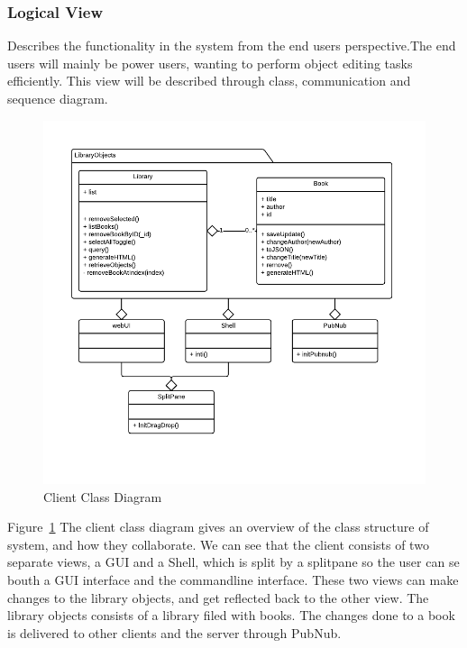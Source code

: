 \subsubsection{Logical View}
Describes the functionality in the system from the end users perspective.The end users will mainly be power users, wanting to perform object editing tasks efficiently. This view will be described through class, communication and sequence diagram.

\begin{figure}
\centering
\includegraphics[width=6in]{image/ClassDiagram.png}
\caption{Client Class Diagram}
\label{figure:clientClassDiagram}
\end{figure}

Figure~\ref{figure:clientClassDiagram} The client class diagram gives an overview of the class structure of system, and how they collaborate. We can see that the client consists of two separate views, a GUI and a Shell, which is split by a splitpane so the user can se bouth a GUI interface and the commandline interface. These two views can make changes to the library objects, and get reflected back to the other view. The library objects consists of a library filed with books. The changes done to a book is delivered to other clients and the server through PubNub. 

